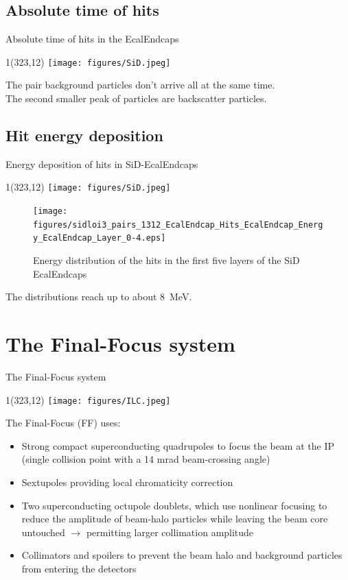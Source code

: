 \documentclass[xcolor={dvipsnames}]{beamer}
\newcommand{\sidlogo}{
  \setlength{\TPHorizModule}{1pt}
  \setlength{\TPVertModule}{1pt}
  \begin{textblock}{1}(323,12)
   \texttt{[image: figures/SiD.jpeg]}
  \end{textblock}
  }
\newcommand{\ilclogo}{
  \setlength{\TPHorizModule}{1pt}
  \setlength{\TPVertModule}{1pt}
  \begin{textblock}{1}(323,12)
   \texttt{[image: figures/ILC.jpeg]}
  \end{textblock}
}
\begin{document}
\subsection{Absolute time of hits}
\begin{frame}{Absolute time of hits in the EcalEndcaps}
\sidlogo
{}
The pair background particles don't arrive all at the same time.\\
The second smaller peak of particles are backscatter particles.
\end{frame} 

\subsection{Hit energy deposition}
\begin{frame}{Energy deposition of hits in SiD-EcalEndcaps}
\sidlogo
 \begin{figure}
 \centering
  \texttt{[image: figures/sidloi3\_pairs\_1312\_EcalEndcap\_Hits\_EcalEndcap\_Energy\_EcalEndcap\_Layer\_0-4.eps]}
 \caption{Energy distribution of the hits in the first five layers of the SiD EcalEndcaps}
 \end{figure}
The distributions reach up to about \SI{8}{\mega\electronvolt}.
\end{frame}

\section{The Final-Focus system}
\begin{frame}{The Final-Focus system}
 \ilclogo
 The Final-Focus (FF) uses:
\begin{itemize}
 \item Strong compact superconducting quadrupoles to focus the
beam at the IP (single collision point with a 14 mrad beam-crossing angle)
\item Sextupoles providing local chromaticity correction
\item Two superconducting octupole doublets, which use nonlinear
focusing to reduce the amplitude of beam-halo particles while leaving the beam core untouched $\rightarrow$ permitting larger collimation amplitude
\item Collimators and spoilers to prevent the beam halo and background particles from entering the detectors
\end{itemize}
\end{frame}
\end{document}

